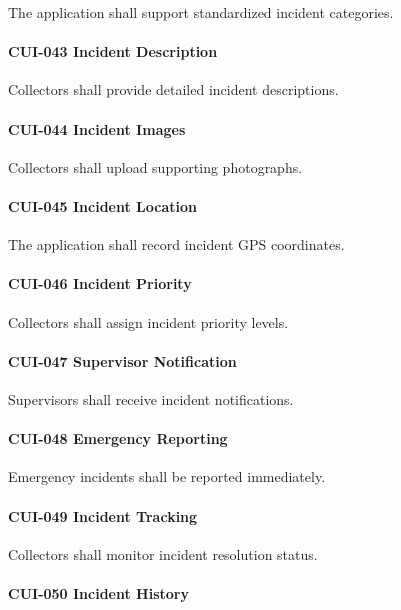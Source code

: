 The application shall support standardized incident categories.

\paragraph{CUI-043 Incident Description}

Collectors shall provide detailed incident descriptions.

\paragraph{CUI-044 Incident Images}

Collectors shall upload supporting photographs.

\paragraph{CUI-045 Incident Location}

The application shall record incident GPS coordinates.

\paragraph{CUI-046 Incident Priority}

Collectors shall assign incident priority levels.

\paragraph{CUI-047 Supervisor Notification}

Supervisors shall receive incident notifications.

\paragraph{CUI-048 Emergency Reporting}

Emergency incidents shall be reported immediately.

\paragraph{CUI-049 Incident Tracking}

Collectors shall monitor incident resolution status.

\paragraph{CUI-050 Incident History}

